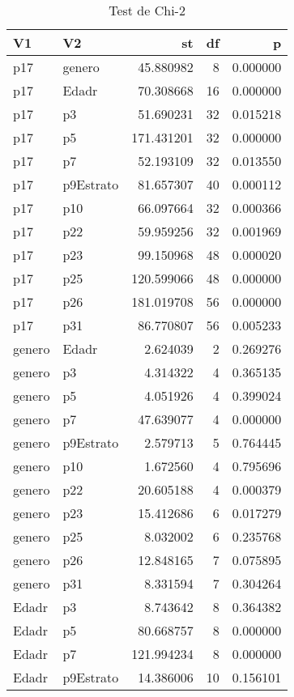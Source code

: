 \begin{table}

\caption{Test de Chi-2}
\centering
\begin{tabular}[t]{l|l|r|r|r}
\hline
V1 & V2 & st & df & p\\
\hline
p17 & genero & 45.880982 & 8 & 0.000000\\
\hline
p17 & Edadr & 70.308668 & 16 & 0.000000\\
\hline
p17 & p3 & 51.690231 & 32 & 0.015218\\
\hline
p17 & p5 & 171.431201 & 32 & 0.000000\\
\hline
p17 & p7 & 52.193109 & 32 & 0.013550\\
\hline
p17 & p9Estrato & 81.657307 & 40 & 0.000112\\
\hline
p17 & p10 & 66.097664 & 32 & 0.000366\\
\hline
p17 & p22 & 59.959256 & 32 & 0.001969\\
\hline
p17 & p23 & 99.150968 & 48 & 0.000020\\
\hline
p17 & p25 & 120.599066 & 48 & 0.000000\\
\hline
p17 & p26 & 181.019708 & 56 & 0.000000\\
\hline
p17 & p31 & 86.770807 & 56 & 0.005233\\
\hline
genero & Edadr & 2.624039 & 2 & 0.269276\\
\hline
genero & p3 & 4.314322 & 4 & 0.365135\\
\hline
genero & p5 & 4.051926 & 4 & 0.399024\\
\hline
genero & p7 & 47.639077 & 4 & 0.000000\\
\hline
genero & p9Estrato & 2.579713 & 5 & 0.764445\\
\hline
genero & p10 & 1.672560 & 4 & 0.795696\\
\hline
genero & p22 & 20.605188 & 4 & 0.000379\\
\hline
genero & p23 & 15.412686 & 6 & 0.017279\\
\hline
genero & p25 & 8.032002 & 6 & 0.235768\\
\hline
genero & p26 & 12.848165 & 7 & 0.075895\\
\hline
genero & p31 & 8.331594 & 7 & 0.304264\\
\hline
Edadr & p3 & 8.743642 & 8 & 0.364382\\
\hline
Edadr & p5 & 80.668757 & 8 & 0.000000\\
\hline
Edadr & p7 & 121.994234 & 8 & 0.000000\\
\hline
Edadr & p9Estrato & 14.386006 & 10 & 0.156101\\

\end{tabular}
\end{table}
